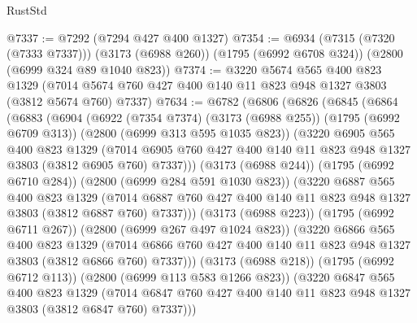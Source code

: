 \begin{lexlean}{RustStd}
\begin{coremodule}
@7337 := @7292 (@7294 @427 @400 @1327)
@7354 := @6934
    (@7315 (@7320 (@7333 @7337)))
    (@3173 (@6988 @260))
    (@1795 (@6992 @6708 @324))
    (@2800 (@6999 @324 @89 @1040 @823))
@7374 := @3220
    @5674
    @565
    @400
    @823
    @1329
    (@7014 @5674 @760 @427 @400 @140 @11 @823 @948 @1327 @3803 (@3812 @5674 @760) @7337)
@7634 := @6782
    (@6806
      (@6826
        (@6845
          (@6864
            (@6883
              (@6904
                (@6922
                  (@7354 @7374)
                  (@3173 (@6988 @255))
                  (@1795 (@6992 @6709 @313))
                  (@2800 (@6999 @313 @595 @1035 @823))
                  (@3220
                    @6905
                    @565
                    @400
                    @823
                    @1329
                    (@7014
                      @6905
                      @760
                      @427
                      @400
                      @140
                      @11
                      @823
                      @948
                      @1327
                      @3803
                      (@3812 @6905 @760)
                      @7337)))
                (@3173 (@6988 @244))
                (@1795 (@6992 @6710 @284))
                (@2800 (@6999 @284 @591 @1030 @823))
                (@3220
                  @6887
                  @565
                  @400
                  @823
                  @1329
                  (@7014
                    @6887
                    @760
                    @427
                    @400
                    @140
                    @11
                    @823
                    @948
                    @1327
                    @3803
                    (@3812 @6887 @760)
                    @7337)))
              (@3173 (@6988 @223))
              (@1795 (@6992 @6711 @267))
              (@2800 (@6999 @267 @497 @1024 @823))
              (@3220
                @6866
                @565
                @400
                @823
                @1329
                (@7014
                  @6866
                  @760
                  @427
                  @400
                  @140
                  @11
                  @823
                  @948
                  @1327
                  @3803
                  (@3812 @6866 @760)
                  @7337)))
            (@3173 (@6988 @218))
            (@1795 (@6992 @6712 @113))
            (@2800 (@6999 @113 @583 @1266 @823))
            (@3220
              @6847
              @565
              @400
              @823
              @1329
              (@7014 @6847 @760 @427 @400 @140 @11 @823 @948 @1327 @3803 (@3812 @6847 @760) @7337)))

\end{coremodule}
\end{lexlean}
